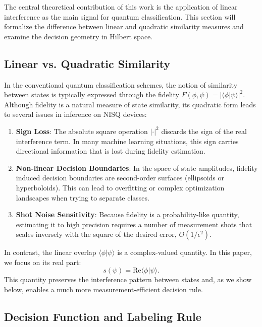 \documentclass[conference]{IEEEtran}
\begin{document}
The central theoretical contribution of this work is the application of linear interference as the main signal for quantum classification. This section will formalize the difference between linear and quadratic similarity measures and examine the decision geometry in Hilbert space.

\subsection{Linear vs. Quadratic Similarity}

In the conventional quantum classification schemes, the notion of similarity between states is typically expressed through the fidelity $F(\phi, \psi) = |\langle \phi | \psi \rangle|^2$. Although fidelity is a natural measure of state similarity, its quadratic form leads to several issues in inference on NISQ devices:
\begin{enumerate}
    \item \textbf{Sign Loss}: The absolute square operation $|\cdot|^2$ discards the sign of the real interference term. In many machine learning situations, this sign carries directional information that is lost during fidelity estimation.
    \item \textbf{Non-linear Decision Boundaries}: In the space of state amplitudes, fidelity induced decision boundaries are second-order surfaces (ellipsoids or hyperboloids). This can lead to overfitting or complex optimization landscapes when trying to separate classes.
    \item \textbf{Shot Noise Sensitivity}: Because fidelity is a probability-like quantity, estimating it to high precision requires a number of measurement shots that scales inversely with the square of the desired error, $O(1/\epsilon^2)$.
\end{enumerate}

In contrast, the linear overlap $\langle \phi | \psi \rangle$ is a complex-valued quantity. In this paper, we focus on its real part:
\begin{equation}
s(\psi) = \mathrm{Re}\langle \phi | \psi \rangle.
\end{equation}
This quantity preserves the interference pattern between states and, as we show below, enables a much more measurement-efficient decision rule.

\subsection{Decision Function and Labeling Rule}
\end{document}
